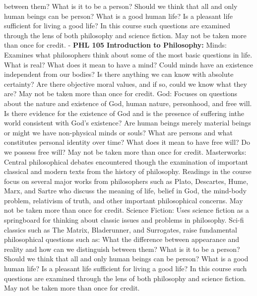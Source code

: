 \documentclass[
  letterpaper,
]{scrbook}
\begin{document}
between them? What is it to be a person? Should we think that all and
only human beings can be person? What is a good human life? Is a
pleasant life sufficient for living a good life? In this course such
questions are examined through the lens of both philosophy and science
fiction. May not be taken more than once for credit. - \textbf{PHL 105
Introduction to Philosophy:} Minds: Examines what philosophers think
about some of the most basic questions in life. What is real? What does
it mean to have a mind? Could minds have an existence independent from
our bodies? Is there anything we can know with absolute certainty? Are
there objective moral values, and if so, could we know what they are?
May not be taken more than once for credit. God: Focuses on questions
about the nature and existence of God, human nature, personhood, and
free will. Is there evidence for the existence of God and is the
presence of suffering inthe world consistent with God's existence? Are
human beings merely material beings or might we have non-physical minds
or souls? What are persons and what constitutes personal identity over
time? What does it mean to have free will? Do we possess free will? May
not be taken more than once for credit. Masterworks: Central
philosophical debates encountered though the examination of important
classical and modern texts from the history of philosophy. Readings in
the course focus on several major works from philosophers such as Plato,
Descartes, Hume, Marx, and Sartre who discuss the meaning of life,
belief in God, the mind-body problem, relativism of truth, and other
important philosophical concerns. May not be taken more than once for
credit. Science Fiction: Uses science fiction as a springboard for
thinking about classic issues and problems in philosophy. Sci-fi
classics such as The Matrix, Bladerunner, and Surrogates, raise
fundamental philosophical questions such as: What the difference between
appearance and reality and how can we distinguish between them? What is
it to be a person? Should we think that all and only human beings can be
person? What is a good human life? Is a pleasant life sufficient for
living a good life? In this course such questions are examined through
the lens of both philosophy and science fiction. May not be taken more
than once for credit.
\end{document}
